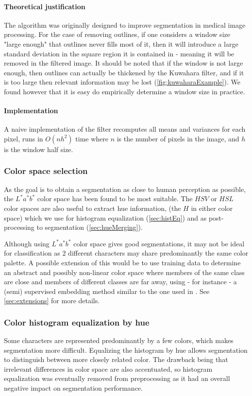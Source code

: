 \paragraph{Theoretical justification} The algorithm was originally designed to improve segmentation in medical image processing. For the case of removing outlines, if one considers a window size "large enough" that outlines never fills most of it, then it will introduce a large standard deviation in the square region it is contained in - meaning it will be removed in the filtered image. It should be noted that if the window is not large enough, then outlines can actually be thickened by the Kuwahara filter, and if it is too large then relevant information may be lost (\autoref{fig:kuwaharaExample}). We found however that it is easy do empirically determine a window size in practice.

\paragraph{Implementation} A naive implementation of the filter recomputes all means and variances for each pixel, runs in $O(nh^2)$ time where $n$ is the number of pixels in the image, and $h$ is the window half size.

\subsubsection{Color space selection}

As the goal is to obtain a segmentation as close to human perception as possible, the $L^*a^*b^*$ color space has been found to be most suitable. The $HSV$ or $HSL$ color spaces are also useful to extract hue information, (the $H$ in either color space) which we use for histogram equalization (\autoref{sec:histEq}) and as post-processing to segmentation (\autoref{sec:hueMerging}).

Although using $L^*a^*b^*$ color space gives good segmentations, it may not be ideal for classification as $2$ different characters may share predominantly the same color palette. A possible extension of this would be to use training data to determine an abstract and possibly non-linear color space where members of the same class are close and members of different classes are far away, using - for instance - a (semi) supervised embedding method similar to the one used in \cite{urahama2007semi}. See \autoref{sec:extensions} for more details.

\subsubsection{Color histogram equalization by hue}
\label{sec:histEq}

Some characters are represented predominantly by a few colors, which makes segmentation more difficult. Equalizing the histogram by hue allows segmentation to distinguish between more closely related color. The drawback being that irrelevant differences in color space are also accentuated, so histogram equalization was eventually removed from preprocessing as it had an overall negative impact on segmentation performance.
